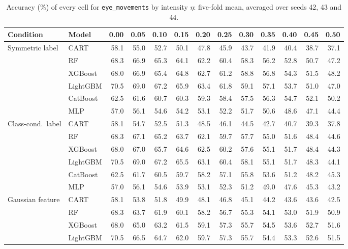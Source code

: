 \documentclass[pdflatex,sn-mathphys]{sn-jnl}
\theoremstyle{thmstyleone}
\begin{document}
\begin{table}[htbp]
\centering
\tiny
\setlength{\tabcolsep}{2.6pt}
\caption{Accuracy (\%) of every cell for \texttt{eye\_movements} by intensity $\eta$: five-fold mean, averaged over seeds 42, 43 and 44.}
\label{tab:grid_eye_movements}
\begin{tabular}{@{}llrrrrrrrrrrr@{}}
\toprule
Condition & Model & 0.00 & 0.05 & 0.10 & 0.15 & 0.20 & 0.25 & 0.30 & 0.35 & 0.40 & 0.45 & 0.50 \\
\midrule
Symmetric label & CART & 58.1 & 55.0 & 52.7 & 50.1 & 47.8 & 45.9 & 43.7 & 41.9 & 40.4 & 38.7 & 37.1 \\
 & RF & 68.3 & 66.9 & 65.3 & 64.1 & 62.2 & 60.4 & 58.3 & 56.2 & 52.8 & 50.7 & 47.2 \\
 & XGBoost & 68.0 & 66.9 & 65.4 & 64.8 & 62.7 & 61.2 & 58.8 & 56.8 & 54.3 & 51.5 & 48.2 \\
 & LightGBM & 70.5 & 69.0 & 67.2 & 65.9 & 63.4 & 61.8 & 59.1 & 57.1 & 53.7 & 51.0 & 47.0 \\
 & CatBoost & 62.5 & 61.6 & 60.7 & 60.3 & 59.3 & 58.4 & 57.5 & 56.3 & 54.7 & 52.1 & 50.2 \\
 & MLP & 57.0 & 56.1 & 54.6 & 54.2 & 53.1 & 52.2 & 51.7 & 50.6 & 48.6 & 47.1 & 44.4 \\
\midrule
Class-cond.\ label & CART & 58.1 & 54.7 & 52.5 & 51.3 & 48.5 & 46.1 & 44.5 & 42.7 & 40.7 & 39.3 & 37.8 \\
 & RF & 68.3 & 67.1 & 65.2 & 63.7 & 62.1 & 59.7 & 57.7 & 55.0 & 51.6 & 48.4 & 44.6 \\
 & XGBoost & 68.0 & 67.0 & 65.7 & 64.6 & 62.5 & 60.2 & 57.6 & 55.1 & 51.7 & 48.4 & 44.3 \\
 & LightGBM & 70.5 & 69.0 & 67.2 & 65.5 & 63.1 & 60.4 & 58.1 & 55.1 & 51.7 & 48.3 & 44.1 \\
 & CatBoost & 62.5 & 61.7 & 60.5 & 59.7 & 58.2 & 57.1 & 55.8 & 53.6 & 51.2 & 48.2 & 45.3 \\
 & MLP & 57.0 & 56.1 & 54.6 & 53.9 & 53.1 & 52.3 & 51.2 & 49.0 & 47.6 & 45.3 & 43.2 \\
\midrule
Gaussian feature & CART & 58.1 & 53.8 & 51.8 & 49.9 & 48.1 & 46.8 & 45.1 & 44.2 & 43.6 & 43.6 & 42.5 \\
 & RF & 68.3 & 63.7 & 61.9 & 60.1 & 58.2 & 56.7 & 55.3 & 54.1 & 53.0 & 51.9 & 50.9 \\
 & XGBoost & 68.0 & 65.0 & 63.2 & 61.5 & 59.1 & 57.3 & 55.7 & 54.5 & 53.6 & 52.7 & 51.6 \\
 & LightGBM & 70.5 & 66.5 & 64.7 & 62.0 & 59.7 & 57.3 & 55.7 & 54.4 & 53.3 & 52.6 & 51.5 \\

\end{tabular}
\end{table}
\end{document}
